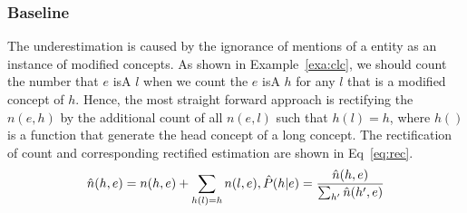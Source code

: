 %
%

\subsubsection{Baseline}
The underestimation is caused by the ignorance of mentions of a entity as an instance of modified concepts. As shown in Example~\ref{exa:clc}, we should count the number that $e$ isA ${l}$ when we count the $e$ isA ${h}$ for any $l$ that is a modified concept of $h$.
Hence, the most straight forward approach is rectifying the $n(e, h)$ by the additional count
of all $n(e, l)$ such that $h(l)=h$, where $h()$ is a function that generate the head concept of a long concept. The rectification of count and corresponding rectified estimation are shown in Eq~\ref{eq:rec}. 
\begin{equation}
\small
\hat{n}(h, e)={n}(h, e)+\sum_{ h(l)=h} n(l,e), \hat{P}(h|e)=\frac{\hat{n}(h, e)}{\sum_{{h'}}{\hat{n}({h'}}, e)}
\label{eq:rec}
\end{equation}



